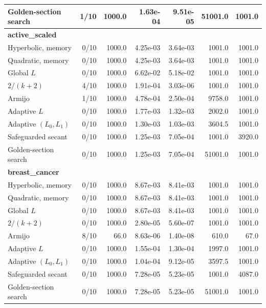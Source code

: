 \begin{table}[p]
\begin{tabular}{lrrrrrr}
Golden-section search & 1/10 & 1000.0 & 1.63e-04 & 9.51e-05 & 51001.0 & 1001.0 \\
\hline
\multicolumn{7}{l}{\textbf{active\_scaled}} \\
Hyperbolic, memory & 0/10 & 1000.0 & 4.25e-03 & 3.64e-03 & 1001.0 & 1001.0 \\
Quadratic, memory & 0/10 & 1000.0 & 4.25e-03 & 3.64e-03 & 1001.0 & 1001.0 \\
Global $L$ & 0/10 & 1000.0 & 6.62e-02 & 5.18e-02 & 1001.0 & 1001.0 \\
$2/(k+2)$ & 4/10 & 1000.0 & 1.91e-04 & 3.03e-06 & 1001.0 & 1001.0 \\
Armijo & 1/10 & 1000.0 & 4.78e-04 & 2.50e-04 & 9758.0 & 1001.0 \\
Adaptive $L$ & 0/10 & 1000.0 & 1.77e-03 & 1.32e-03 & 2002.0 & 1001.0 \\
Adaptive $(L_0,L_1)$ & 0/10 & 1000.0 & 1.30e-03 & 1.03e-03 & 3604.5 & 1001.0 \\
Safeguarded secant & 0/10 & 1000.0 & 1.25e-03 & 7.05e-04 & 1001.0 & 3920.0 \\
Golden-section search & 0/10 & 1000.0 & 1.25e-03 & 7.05e-04 & 51001.0 & 1001.0 \\
\hline
\multicolumn{7}{l}{\textbf{breast\_cancer}} \\
Hyperbolic, memory & 0/10 & 1000.0 & 8.67e-03 & 8.41e-03 & 1001.0 & 1001.0 \\
Quadratic, memory & 0/10 & 1000.0 & 8.67e-03 & 8.41e-03 & 1001.0 & 1001.0 \\
Global $L$ & 0/10 & 1000.0 & 8.67e-03 & 8.41e-03 & 1001.0 & 1001.0 \\
$2/(k+2)$ & 0/10 & 1000.0 & 2.80e-05 & 5.60e-07 & 1001.0 & 1001.0 \\
Armijo & 8/10 & 66.0 & 8.63e-06 & 1.40e-08 & 610.0 & 67.0 \\
Adaptive $L$ & 0/10 & 1000.0 & 1.55e-04 & 1.30e-04 & 1997.0 & 1001.0 \\
Adaptive $(L_0,L_1)$ & 0/10 & 1000.0 & 1.04e-04 & 9.12e-05 & 3597.5 & 1001.0 \\
Safeguarded secant & 0/10 & 1000.0 & 7.28e-05 & 5.23e-05 & 1001.0 & 4087.0 \\
Golden-section search & 0/10 & 1000.0 & 7.28e-05 & 5.23e-05 & 51001.0 & 1001.0 \\
\hline
\end{tabular}
\end{table}
